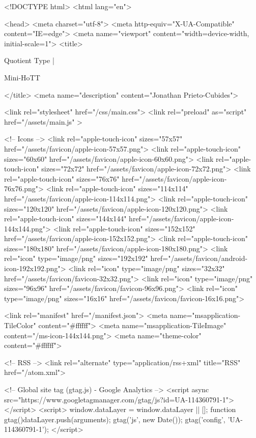 <!DOCTYPE html>
<html lang="en">

<head>
  <meta charset="utf-8">
  <meta http-equiv="X-UA-Compatible" content="IE=edge">
  <meta name="viewport" content="width=device-width, initial-scale=1">
  <title>
    
      
        Quotient Type |
      
        Mini-HoTT
    
  </title>
  <meta name="description" content="Jonathan Prieto-Cubides">

  <link rel="stylesheet" href="/css/main.css">
  <link rel="preload" as="script" href="/assets/main.js" >

  <!-- Icons -->
  <link rel="apple-touch-icon" sizes="57x57" href="/assets/favicon/apple-icon-57x57.png">
  <link rel="apple-touch-icon" sizes="60x60" href="/assets/favicon/apple-icon-60x60.png">
  <link rel="apple-touch-icon" sizes="72x72" href="/assets/favicon/apple-icon-72x72.png">
  <link rel="apple-touch-icon" sizes="76x76" href="/assets/favicon/apple-icon-76x76.png">
  <link rel="apple-touch-icon" sizes="114x114" href="/assets/favicon/apple-icon-114x114.png">
  <link rel="apple-touch-icon" sizes="120x120" href="/assets/favicon/apple-icon-120x120.png">
  <link rel="apple-touch-icon" sizes="144x144" href="/assets/favicon/apple-icon-144x144.png">
  <link rel="apple-touch-icon" sizes="152x152" href="/assets/favicon/apple-icon-152x152.png">
  <link rel="apple-touch-icon" sizes="180x180" href="/assets/favicon/apple-icon-180x180.png">
  <link rel="icon" type="image/png" sizes="192x192"  href="/assets/favicon/android-icon-192x192.png">
  <link rel="icon" type="image/png" sizes="32x32" href="/assets/favicon/favicon-32x32.png">
  <link rel="icon" type="image/png" sizes="96x96" href="/assets/favicon/favicon-96x96.png">
  <link rel="icon" type="image/png" sizes="16x16" href="/assets/favicon/favicon-16x16.png">

  <link rel="manifest" href="/manifest.json">
  <meta name="msapplication-TileColor" content="#ffffff">
  <meta name="msapplication-TileImage" content="/ms-icon-144x144.png">
  <meta name="theme-color" content="#ffffff">

  <!-- RSS -->
  <link rel="alternate" type="application/rss+xml" title="RSS" href="/atom.xml">

  <!-- Global site tag (gtag.js) - Google Analytics -->
  <script async src="https://www.googletagmanager.com/gtag/js?id=UA-114360791-1"></script>
  <script>
    window.dataLayer = window.dataLayer || [];
    function gtag(){dataLayer.push(arguments);}
    gtag('js', new Date());
    gtag('config', 'UA-114360791-1');
  </script>

